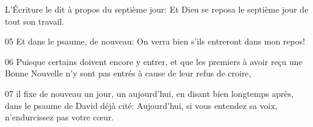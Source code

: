 
L’Écriture le dit à propos du septième jour: Et Dieu se reposa le septième jour de tout son travail.

05 Et dans le psaume, de nouveau: On verra bien s’ils entreront dans mon repos!

06 Puisque certains doivent encore y entrer, et que les premiers à avoir reçu une Bonne Nouvelle n’y sont pas entrés à cause de leur refus de croire,

07 il fixe de nouveau un jour, un aujourd’hui, en disant bien longtemps après, dans le psaume de David déjà cité: Aujourd’hui, si vous entendez sa voix, n’endurcissez pas votre cœur.
